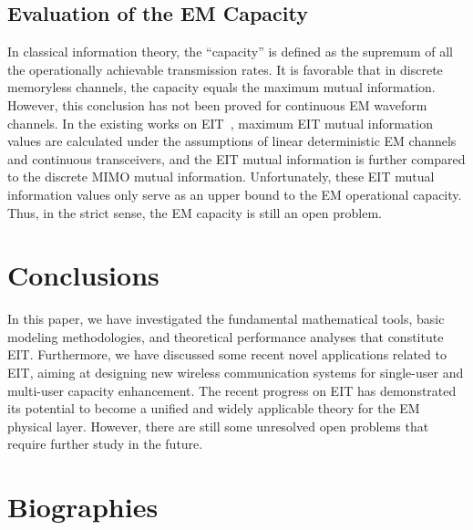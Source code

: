 \documentclass[journal,twocolumn]{IEEEtran}
\begin{document}
\subsection{Evaluation of the EM Capacity}
In classical information theory, the ``capacity'' is defined as the supremum of all the operationally achievable transmission rates. It is favorable that in discrete memoryless channels, the capacity equals the maximum mutual information. However, this conclusion has not been proved for continuous EM waveform channels. In the existing works on EIT~\cite{wan2022mutual,zhang2022pdma,marzetta2022fourier}, maximum EIT mutual information values are calculated under the assumptions of linear deterministic EM channels and continuous transceivers, and the EIT mutual information is further compared to the discrete MIMO mutual information. Unfortunately, these EIT mutual information values only serve as an upper bound to the EM operational capacity. 
Thus, in the strict sense, the EM capacity is still an open problem. 

\section{Conclusions}
In this paper, we have investigated the fundamental mathematical tools, basic modeling methodologies, and theoretical performance analyses that constitute EIT. 
Furthermore, we have discussed some recent novel applications related to EIT, aiming at designing new wireless communication systems for single-user and multi-user capacity enhancement. 
The recent progress on EIT has demonstrated its potential to become a unified and widely applicable theory for the EM physical layer. However, there are still some unresolved open problems that require further study in the future. 


\footnotesize




\normalsize
\vspace{-1em}
\section*{Biographies}
\end{document}
